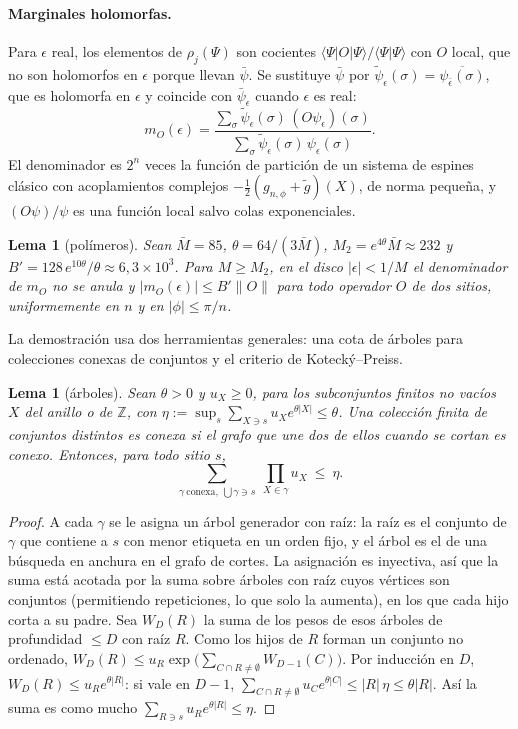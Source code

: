 \documentclass[11pt,a4paper]{article}
\newtheorem{lema}[teorema]{Lema}
\theoremstyle{remark}
\begin{document}
\paragraph{Marginales holomorfas.} Para $\epsilon$ real, los elementos de $\rho_j(\Psi)$ son cocientes
$\langle\Psi|O|\Psi\rangle/\langle\Psi|\Psi\rangle$ con $O$ local, que no son holomorfos en $\epsilon$
porque llevan $\bar\psi$. Se sustituye $\bar\psi$ por
$\tilde\psi_\epsilon(\sigma)=\overline{\psi_{\bar\epsilon}(\sigma)}$, que es holomorfa en $\epsilon$ y coincide con
$\bar\psi_\epsilon$ cuando $\epsilon$ es real:
\[
  m_O(\epsilon)=\frac{\sum_\sigma\tilde\psi_\epsilon(\sigma)\,(O\psi_\epsilon)(\sigma)}{\sum_\sigma\tilde\psi_\epsilon(\sigma)\,\psi_\epsilon(\sigma)} .
\]
El denominador es $2^n$ veces la función de partición de un sistema de espines clásico con
acoplamientos complejos $-\tfrac12(g_{n,\phi}+\tilde g)(X)$, de norma pequeña, y $(O\psi)/\psi$ es una
función local salvo colas exponenciales.

\begin{lema}[polímeros]\label{lem:polimeros}
Sean $\bar M=85$, $\theta=64/(3\bar M)$, $M_2=e^{4\theta}\bar M\approx232$ y
$B'=128\,e^{10\theta}/\theta\approx6{,}3\times10^3$. Para $M\ge M_2$, en el disco $|\epsilon|<1/M$ el denominador
de $m_O$ no se anula y $|m_O(\epsilon)|\le B'\|O\|$ para todo operador $O$ de dos sitios, uniformemente
en $n$ y en $|\phi|\le\pi/n$.
\end{lema}

La demostración usa dos herramientas generales: una cota de árboles para colecciones conexas
de conjuntos y el criterio de Kotecký--Preiss.

\begin{lema}[árboles]\label{lem:arboles}
Sean $\theta>0$ y $u_X\ge0$, para los subconjuntos finitos no vacíos $X$ del anillo o de $\mathbb Z$,
con $\eta:=\sup_s\sum_{X\ni s}u_Xe^{\theta|X|}\le\theta$. Una colección finita de conjuntos distintos es
\emph{conexa} si el grafo que une dos de ellos cuando se cortan es conexo. Entonces, para todo sitio
$s$,
\[
  \sum_{\gamma\ \text{conexa},\ \bigcup\gamma\ni s}\ \prod_{X\in\gamma}u_X\ \le\ \eta .
\]
\end{lema}

\begin{proof}
A cada $\gamma$ se le asigna un árbol generador con raíz: la raíz es el conjunto de $\gamma$ que
contiene a $s$ con menor etiqueta en un orden fijo, y el árbol es el de una búsqueda en anchura en el
grafo de cortes. La asignación es inyectiva, así que la suma está acotada por la suma sobre árboles
con raíz cuyos vértices son conjuntos (permitiendo repeticiones, lo que solo la aumenta), en los que
cada hijo corta a su padre. Sea $W_D(R)$ la suma de los pesos de esos árboles de profundidad $\le D$
con raíz $R$. Como los hijos de $R$ forman un conjunto no ordenado,
$W_D(R)\le u_R\exp\big(\sum_{C\cap R\ne\emptyset}W_{D-1}(C)\big)$. Por inducción en $D$,
$W_D(R)\le u_Re^{\theta|R|}$: si vale en $D-1$,
$\sum_{C\cap R\ne\emptyset}u_Ce^{\theta|C|}\le|R|\,\eta\le\theta|R|$. Así la suma es como mucho
$\sum_{R\ni s}u_Re^{\theta|R|}\le\eta$.
\end{proof}
\end{document}
